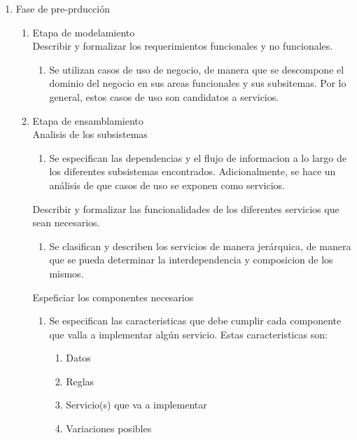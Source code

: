 \begin{enumerate}
  \item Fase de pre-prducción
	\begin{enumerate}
	  \item Etapa de modelamiento \\
		Describir y formalizar los requerimientos funcionales y no funcionales.
		\begin{enumerate}
		  \item Se utilizan casos de uso de negocio, de manera que se descompone el dominio del negocio en sus areas funcionales y sus subsitemas. Por lo general, estos casos de uso son candidatos a servicios.
		\end{enumerate}
	\item Etapa de ensamblamiento \\
		Analisis de los subsistemas
			\begin{enumerate}
			  \item Se especifican las dependencias y el flujo de informacion a lo largo de los diferentes subsistemas encontrados. Adicionalmente, se hace un análisis de que casos de uso se exponen como servicios.
			  \end{enumerate}
			  Describir y formalizar las funcionalidades de los diferentes servicios que sean necesarios. \\
			  \begin{enumerate}
			  \item Se clasifican y describen los servicios de manera jerárquica, de manera que se pueda determinar la interdependencia y composicion de los mismos.
			  \end{enumerate}
		Espeficiar los componentes necesarios
		\begin{enumerate}
		  \item Se especifican las caracteristicas que debe cumplir cada componente que valla a implementar algún servicio. Estas caracteristicas son:
				\begin{enumerate}
				  \item Datos
				  \item Reglas
				  \item Servicio(s) que va a implementar
				  \item Variaciones posibles
				\end{enumerate}
		\end{enumerate}
	\end{enumerate}
	

	
	

\end{enumerate}
